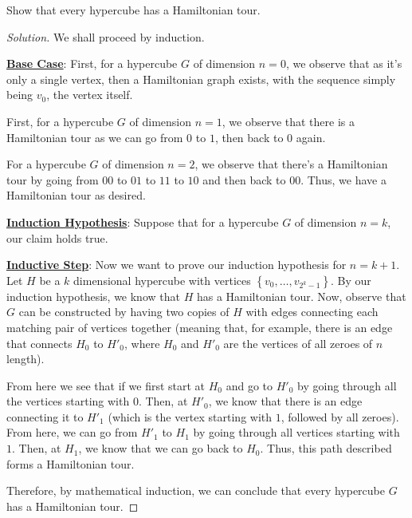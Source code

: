 \documentclass{article}
\newenvironment{solution}{\begin{proof}[Solution]}{\end{proof}}
\begin{document}
\begin{hw}
	Show that every hypercube has a Hamiltonian tour. 
\end{hw}
\begin{solution}
	We shall proceed by induction.
	
	\textbf{\underline{Base Case}}: First, for a hypercube $G$ of dimension $n=0$, we observe that as it's only a single vertex, then a Hamiltonian graph exists, with the sequence simply being $v_{0}$, the vertex itself.
	
	First, for a hypercube $G$ of dimension $n=1$, we observe that there is a Hamiltonian tour as we can go from $0$ to $1$, then back to $0$ again.
	
	For a hypercube $G$ of dimension $n=2$, we observe that there's a Hamiltonian tour by going from $00$ to $01$ to $11$ to $10$ and then back to $00$. Thus, we have a Hamiltonian tour as desired.
	
	\textbf{\underline{Induction Hypothesis}}: Suppose that for a hypercube $G$ of dimension $n=k$, our claim holds true.
	
	\textbf{\underline{Inductive Step}}: Now we want to prove our induction hypothesis for $n=k+1$. Let $H$ be a $k$ dimensional hypercube with vertices $\left\{ v_{0}, \ldots, v_{2^{k}-1}\right\}$. By our induction hypothesis, we know that $H$ has a Hamiltonian tour. Now, observe that $G$ can be constructed by having two copies of $H$ with edges connecting each matching pair of vertices together (meaning that, for example, there is an edge that connects $H_{0}$ to $H'_{0}$, where $H_{0}$ and $H'_{0}$ are the vertices of all zeroes of $n$ length).
	
	From here we see that if we first start at $H_{0}$ and go to $H'_{0}$ by going through all the vertices starting with $0$. Then, at $H'_{0}$, we know that there is an edge connecting it to $H'_{1}$ (which is the vertex starting with $1$, followed by all zeroes). From here, we can go from $H'_{1}$ to $H_{1}$ by going through all vertices starting with $1$. Then, at $H_{1}$, we know that we can go back to $H_{0}$. Thus, this path described forms a Hamiltonian tour.
	
	Therefore, by mathematical induction, we can conclude that every hypercube $G$ has a Hamiltonian tour.
\end{solution}

\newpage
\end{document}
